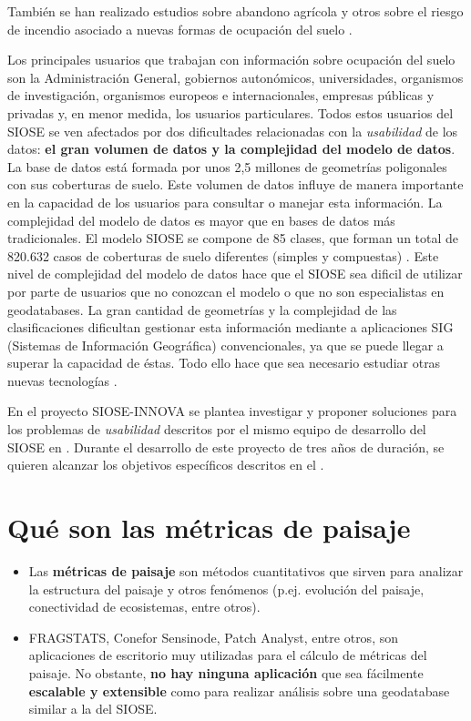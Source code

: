 También se han realizado estudios sobre abandono agrícola \citep{Zaragozi2011} y otros sobre el riesgo de incendio asociado a nuevas formas de ocupación del suelo \citep{Vazquez2017}.

Los principales usuarios que trabajan con información sobre ocupación del suelo son la Administración General, gobiernos autonómicos, universidades, organismos de investigación, organismos europeos e internacionales, empresas públicas y privadas y, en menor medida, los usuarios particulares. Todos estos usuarios del SIOSE se ven afectados por dos dificultades relacionadas con la \textit{usabilidad} de los datos: \textbf{el gran volumen de datos y la complejidad del modelo de datos}. La base de datos está formada por unos 2,5 millones de geometrías poligonales con sus coberturas de suelo. Este volumen de datos influye de manera importante en la capacidad de los usuarios para consultar o manejar esta información. La complejidad del modelo de datos es mayor que en bases de datos más tradicionales. El modelo SIOSE se compone de 85 clases, que forman un total de 820.632 casos de coberturas de suelo diferentes (simples y compuestas) \citep{FernandezVillarino2012}. Este nivel de complejidad del modelo de datos hace que el SIOSE sea dificil de utilizar por parte de usuarios que no conozcan el modelo o que no son especialistas en geodatabases. La gran cantidad de geometrías y la complejidad de las clasificaciones dificultan gestionar esta información mediante a aplicaciones SIG (Sistemas de Información Geográfica) convencionales, ya que se puede llegar a superar la capacidad de éstas. Todo ello hace que sea necesario estudiar otras nuevas tecnologías \citep{NavarroCarrion2016}.

En el proyecto SIOSE-INNOVA se plantea investigar y proponer soluciones para los problemas de \textit{usabilidad} descritos por el mismo equipo de desarrollo del SIOSE en \citet{FernandezVillarino2012}. Durante el desarrollo de este proyecto de tres años de duración, se quieren alcanzar los objetivos específicos descritos en el .


\section{Qué son las métricas de paisaje}\label{sec:metrica}

\begin{graybox}
\begin{itemize}
\item Las \textbf{métricas de paisaje} son métodos cuantitativos que sirven para analizar la estructura del paisaje y otros fenómenos (p.ej. evolución del paisaje, conectividad de ecosistemas, entre otros).
\item FRAGSTATS, Conefor Sensinode, Patch Analyst, entre otros, son aplicaciones de escritorio muy utilizadas para el cálculo de métricas del paisaje. No obstante, \textbf{no hay ninguna aplicación} que sea fácilmente \textbf{escalable y extensible} como para realizar análisis sobre una geodatabase similar a la del SIOSE.
\end{itemize}
\end{graybox}

